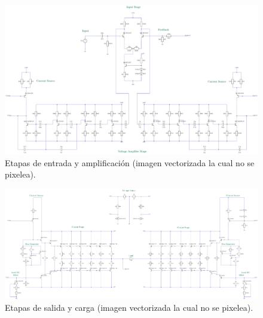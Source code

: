 \begin{figure}[H]
\centering
	\includegraphics[width=\textwidth]{ImagenesCaracteristicas/TEX1.pdf}
	\caption{Etapas de entrada y amplificación (imagen vectorizada la cual no se pixelea).}
	\label{fig:circ}
\end{figure}
\begin{figure}[H]
\centering
	\includegraphics[width=\textwidth]{ImagenesCaracteristicas/TEX2.pdf}
	\caption{Etapas de salida y carga (imagen vectorizada la cual no se pixelea).}
	\label{fig:circ2}
\end{figure}